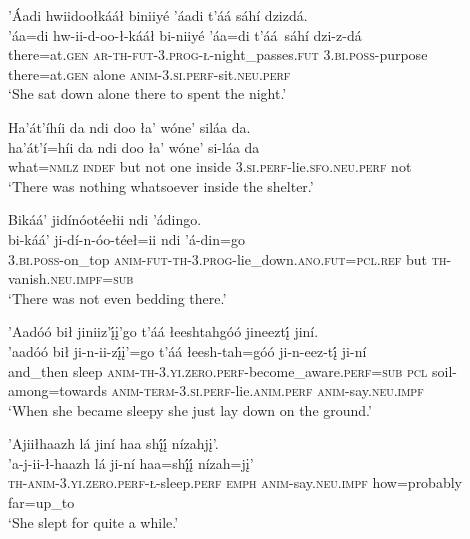 \ea\label{ex:text5-8-4}
’Áadi hwiidoołkááł biniiyé ’áadi t’áá sáhí dzizdá.\\
\gll ’áa=di	hw-ii-d-oo-ł-kááł	bi-niiyé	’áa=di	t’áá~{sáhí}	dzi-z-dá\\
     there=at.\textsc{gen}	\textsc{ar}-\textsc{th}-\textsc{fut}-3.\textsc{prog}-\textsc{ł}-night\_passes.\textsc{fut}	3.\textsc{bi}.\textsc{poss}-purpose	there=at.\textsc{gen}	alone	\textsc{anim}-3.\textsc{si}.\textsc{perf}-sit.\textsc{neu}.\textsc{perf}\\
\glt `She sat down alone there to spent the night.'
\z

\ea\label{ex:text5-8-5}
Ha’át’íhíi da ndi doo ła’ wóne’ siláa da.\\
\gll ha’át’í=híi	da	ndi	doo	ła’	wóne’	si-láa	da\\
     what=\textsc{nmlz}	\textsc{indef}	but	not	one	inside	3.\textsc{si}.\textsc{perf}-lie.\textsc{sfo}.\textsc{neu}.\textsc{perf}	not\\
\glt `There was nothing whatsoever inside the shelter.'
\z

\ea\label{ex:text5-8-6}
Bikáá’ jidínóotéełii ndi ’ádingo.\\
\gll bi-káá’	ji-dí-n-óo-téeł=ii	ndi	’á-din=go\\
     3.\textsc{bi}.\textsc{poss}-on\_top	\textsc{anim}-\textsc{fut}-\textsc{th}-3.\textsc{prog}-lie\_down.\textsc{ano}.\textsc{fut}=\textsc{pcl}.\textsc{ref}	but	\textsc{th}-vanish.\textsc{neu}.\textsc{impf}=\textsc{sub}\\
\glt `There was not even bedding there.'
\z

\ea\label{ex:text5-8-7}
’Aadóó bił jiniiz’į́į’go t’áá łeeshtahgóó jineeztį́ jiní.\\
\gll ’aadóó	bił	ji-n-ii-zį́į’=go	t’áá	łeesh-tah=góó	ji-n-eez-tį́	ji-ní\\
     and\_then	sleep	\textsc{anim}-\textsc{th}-3.\textsc{yi}.\textsc{zero}.\textsc{perf}-become\_aware.\textsc{perf}=\textsc{sub}	\textsc{pcl}	soil-among=towards	\textsc{anim}-\textsc{term}-3.\textsc{si}.\textsc{perf}-lie.\textsc{anim}.\textsc{perf}	\textsc{anim}-say.\textsc{neu}.\textsc{impf}\\
\glt `When she became sleepy she just lay down on the ground.'
\z

\ea\label{ex:text5-8-8}
’Ajiiłhaazh lá jiní haa shį́į́ nízahjį’.\\
\gll ’a-j-ii-ł-haazh	lá	ji-ní	haa=shį́į́	nízah=jį’\\
     \textsc{th}-\textsc{anim}-3.\textsc{yi}.\textsc{zero}.\textsc{perf}-\textsc{ł}-sleep.\textsc{perf}	\textsc{emph}	\textsc{anim}-say.\textsc{neu}.\textsc{impf}	how=probably	far=up\_to\\
\glt `She slept for quite a while.'
\z

